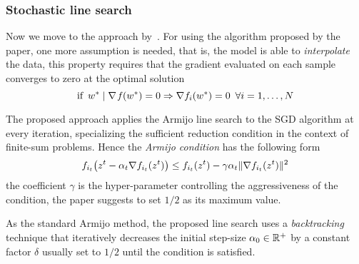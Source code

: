 \subsubsection{Stochastic line search}

Now we move to the approach by~\textcite{vaswani_painless_2019}. For using the algorithm proposed by the paper, one more assumption is needed, that is, the model is able to \emph{interpolate} the data, this property requires that the gradient evaluated on each sample converges to zero at the optimal solution
\[
\text{if}\,\,\,w^\ast\mid\nabla\operatorname*{\mathit{f}}(w^\ast)=0\Rightarrow\nabla f_i(w^\ast)=0\,\,\,\forall i=1,\dots,N
\]

The proposed approach applies the Armijo line search to the SGD algorithm at every iteration, specializing the sufficient reduction condition in the context of finite-sum problems. Hence the \emph{Armijo condition} has the following form
\begin{equation}\label{eq:mini-armijo}
f_{i_t}\bigl(z^t-\alpha_t\nabla f_{i_t}(z^t)\bigr)\leq f_{i_t}(z^t)-\gamma\alpha_t\lVert\nabla f_{i_t}(z^t)\rVert^2
\end{equation}
the coefficient $\gamma$ is the hyper-parameter controlling the aggressiveness of the condition, the paper suggests to set $1/2$ as its maximum value.


As the standard Armijo method, the proposed line search uses a \emph{backtracking} technique that iteratively decreases the initial step-size $\alpha_0\in\mathbb{R}^+$ by a constant factor $\delta$ usually set to $1/2$ until the condition is satisfied.

